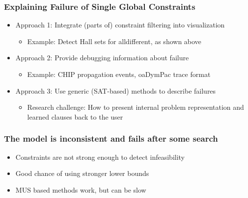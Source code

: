 \documentclass[dvipsnames,aspectratio=169]{beamer}
\begin{document}
\begin{frame}
\frametitle{Explaining Failure of Single Global Constraints \cite{DBLP:conf/discipl/SimonisABB00}}
\begin{itemize}
\item Approach 1: Integrate (parts of) constraint filtering into visualization
\begin{itemize}
\item Example: Detect Hall sets for alldifferent, as shown above
\end{itemize}
\item Approach 2: Provide debugging information about failure
\begin{itemize}
\item Example: CHIP propagation events, oaDymPac trace format
\end{itemize}
\item Approach 3: Use generic (SAT-based) methods to describe failures
\begin{itemize}
\item Research challenge: How to present internal problem representation and learned clauses back to the user 
\end{itemize}
\end{itemize}
\end{frame}

%
%
%


\begin{frame}
\frametitle{The model is inconsistent and fails after some search}
\begin{itemize}
\item Constraints are not strong enough to detect infeasibility
\item Good chance of using stronger lower bounds
\item MUS based methods work, but can be slow
\end{itemize}
\end{frame}
\end{document}
